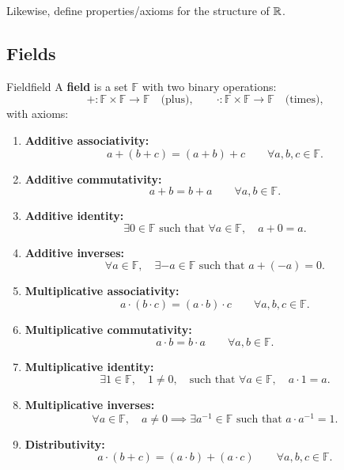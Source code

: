 Likewise, define properties/axioms for the structure of $\mathbb{R}$.

\subsection{Fields}

\begin{definition}{Field}{field}
  A \textbf{field} is a set $\mathbb{F}$ with two binary operations:
  \[
    +\colon\mathbb{F}\times\mathbb{F}\to\mathbb{F}
    \quad\text{(plus)},\qquad
    \cdot\colon\mathbb{F}\times\mathbb{F}\to\mathbb{F}
    \quad\text{(times)},
  \]
  with axioms:
  \begin{enumerate}[leftmargin=3em]
    \item[(A1)] \textbf{Additive associativity:}
          \[
            a+(b+c)=(a+b)+c\qquad\forall a,b,c\in\mathbb{F}.
          \]
    \item[(A2)] \textbf{Additive commutativity:}
          \[
            a+b=b+a\qquad\forall a,b\in\mathbb{F}.
          \]
    \item[(A3)] \textbf{Additive identity:}
          \[
            \exists 0\in\mathbb{F}\text{ such that }\forall a\in\mathbb{F},\quad a+0=a.
          \]
    \item[(A4)] \textbf{Additive inverses:}
          \[
            \forall a\in\mathbb{F},\quad\exists -a\in\mathbb{F}\text{ such that }a+(-a)=0.
          \]
    \item[(M1)] \textbf{Multiplicative associativity:}
          \[
            a\cdot(b\cdot c)=(a\cdot b)\cdot c\qquad\forall a,b,c\in\mathbb{F}.
          \]
    \item[(M2)] \textbf{Multiplicative commutativity:}
          \[
            a\cdot b=b\cdot a\qquad\forall a,b\in\mathbb{F}.
          \]
    \item[(M3)] \textbf{Multiplicative identity:}
          \[
            \exists 1\in\mathbb{F},\quad 1\ne0,\quad
            \text{such that }\forall a\in\mathbb{F},\quad a\cdot1=a.
          \]
    \item[(M4)] \textbf{Multiplicative inverses:}
          \[
            \forall a\in\mathbb{F},\quad a\ne0\implies
            \exists a^{-1}\in\mathbb{F}\text{ such that }a\cdot a^{-1}=1.
          \]
    \item[(D)] \textbf{Distributivity:}
          \[
            a\cdot(b+c)=(a\cdot b)+(a\cdot c)\qquad\forall a,b,c\in\mathbb{F}.
          \]
  \end{enumerate}
\end{definition}

